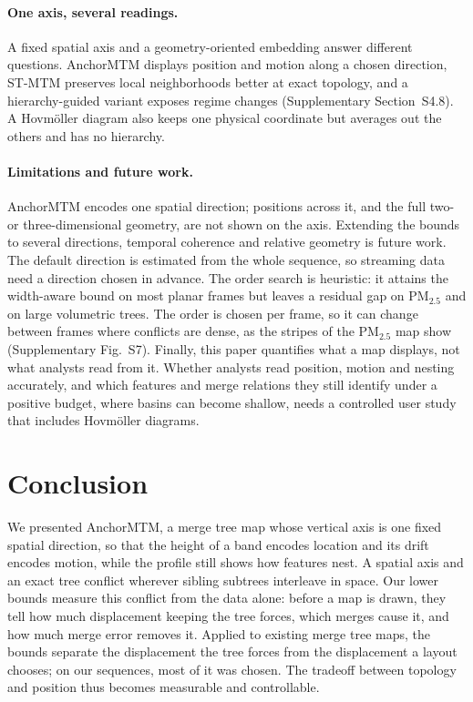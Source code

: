 \paragraph{One axis, several readings.} A fixed spatial axis and a geometry-oriented embedding answer different questions. AnchorMTM displays position and motion along a chosen direction, ST-MTM preserves local neighborhoods better at exact topology, and a hierarchy-guided variant exposes regime changes (Supplementary Section~S4.8). A Hovm\"oller diagram also keeps one physical coordinate but averages out the others and has no hierarchy.

\paragraph{Limitations and future work.} AnchorMTM encodes one spatial direction; positions across it, and the full two- or three-dimensional geometry, are not shown on the axis. Extending the bounds to several directions, temporal coherence and relative geometry is future work. The default direction is estimated from the whole sequence, so streaming data need a direction chosen in advance. The order search is heuristic: it attains the width-aware bound on most planar frames but leaves a residual gap on PM$_{2.5}$ and on large volumetric trees. The order is chosen per frame, so it can change between frames where conflicts are dense, as the stripes of the PM$_{2.5}$ map show (Supplementary Fig.~S7). Finally, this paper quantifies what a map displays, not what analysts read from it. Whether analysts read position, motion and nesting accurately, and which features and merge relations they still identify under a positive budget, where basins can become shallow, needs a controlled user study that includes Hovm\"oller diagrams.

\section{Conclusion}\label{sec:conclusion}
We presented AnchorMTM, a merge tree map whose vertical axis is one fixed spatial direction, so that the height of a band encodes location and its drift encodes motion, while the profile still shows how features nest. A spatial axis and an exact tree conflict wherever sibling subtrees interleave in space. Our lower bounds measure this conflict from the data alone: before a map is drawn, they tell how much displacement keeping the tree forces, which merges cause it, and how much merge error removes it. Applied to existing merge tree maps, the bounds separate the displacement the tree forces from the displacement a layout chooses; on our sequences, most of it was chosen. The tradeoff between topology and position thus becomes measurable and controllable.
